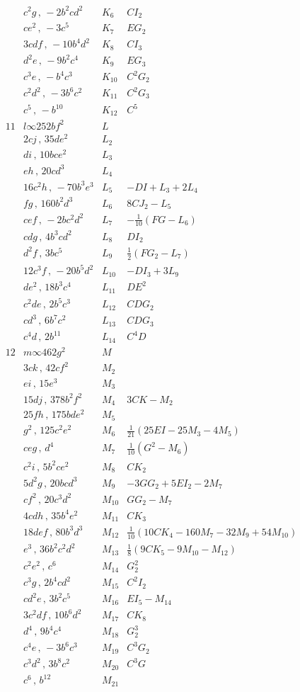 \documentclass[11pt]{article}
\begin{document}
\[\begin{array}{c|l|c|l}
 & c^2g\,,\, -2b^2cd^2&K_6&CI_2\\
 & ce^2\,,\, -3c^5&K_7&EG_2\\
 & 3cdf\,,\, -10b^4d^2&K_8&CI_3\\
 & d^2e\,,\, -9b^2c^4&K_9&EG_3\\
 & c^3e\,,\, -b^4c^3&K_{10}&C^2G_2\\
 & c^2d^2\,,\, -3b^6c^2&K_{11}&C^2G_3\\
 & c^5\,,\, -b^{10}&K_{12}&C^5\\ \hline
11& l\infty 252bf^2&L&\\
 & 2cj\,,\, 35de^2&L_2&\\
 & di\,,\, 10bce^2&L_3&\\
 & eh\,,\, 20cd^3&L_4&\\
 & 16c^2h\,,\, -70b^3e^3&L_5&-DI+L_3+2L_4\\
 & fg\,,\, 160b^2d^3&L_6&8CJ_2-L_5\\
 & cef\,,\, -2bc^2d^2&L_7&-\frac1{10}(FG-L_6)\\
 & cdg\,,\, 4b^3cd^2&L_8&DI_2\\
 & d^2f\,,\, 3bc^5&L_9&\frac12(FG_2-L_7)\\
 & 12c^3f\,,\, -20b^5d^2&L_{10}&-DI_3+3L_9\\
 & de^2\,,\, 18b^3c^4&L_{11}&DE^2\\
 & c^2de\,,\, 2b^5c^3&L_{12}&CDG_2\\
 & cd^3\,,\, 6b^7c^2&L_{13}&CDG_3\\
 & c^4d\,,\, 2b^{11}&L_{14}&C^4D\\ \hline
12& m\infty 462g^2&M&\\
 & 3ck\,,\, 42cf^2&M_2&\\
 & ei\,,\, 15e^3&M_3&\\
 & 15dj\,,\, 378b^2f^2&M_4&3CK-M_2\\
 & 25fh\,,\, 175bde^2&M_5&\\
 & g^2\,,\, 125c^2e^2&M_6&\frac1{21}(25EI-25M_3-4M_5)\\
 & ceg\,,\, d^4&M_7&\frac1{10}(G^2-M_6)\\
 & c^2i\,,\, 5b^2ce^2&M_8&CK_2\\
 & 5d^2g\,,\, 20bcd^3&M_9&-3GG_2+5EI_2-2M_7\\
 & cf^2\,,\, 20c^3d^2&M_{10}&GG_2-M_7\\
 & 4cdh\,,\, 35b^4e^2&M_{11}&CK_3\\
 & 18def\,,\, 80b^3d^3&M_{12}&\frac1{10}(10CK_4-160M_7-32M_9+54M_{10})\\
 & e^3\,,\, 36b^2c^2d^2&M_{13}&\frac18(9CK_5-9M_{10}-M_{12})\\
 & c^2e^2\,,\, c^6&M_{14}&G_2^2\\
 & c^3g\,,\, 2b^4cd^2&M_{15}&C^2I_2\\
 & cd^2e\,,\, 3b^2c^5&M_{16}&EI_5-M_{14}\\
 & 3c^2df\,,\, 10b^6d^2&M_{17}&CK_8\\
 & d^4\,,\, 9b^4c^4&M_{18}&G_2^3\\
 & c^4e\,,\, -3b^6c^3&M_{19}&C^3G_2\\
 & c^3d^2\,,\, 3b^8c^2&M_{20}&C^3G\\
 & c^6\,,\, b^{12}&M_{21}&
\end{array}
\]
\endgroup
\end{document}
